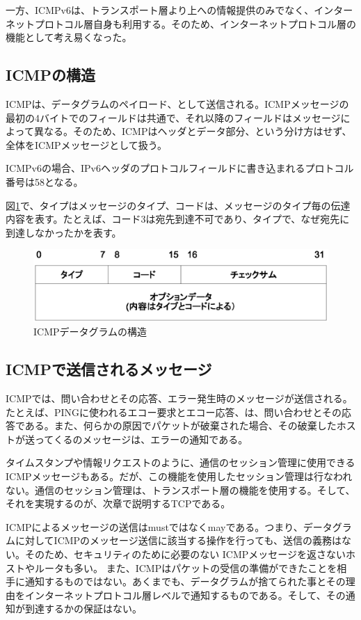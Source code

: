 一方、ICMPv6は、トランスポート層より上への情報提供のみでなく、インターネットプロトコル層自身も利用する。そのため、インターネットプロトコル層の機能として考え易くなった。

\subsection{ICMPの構造}

ICMPは、データグラムのペイロード、として送信される。ICMPメッセージの最初の4バイトでのフィールドは共通で、それ以降のフィールドはメッセージによって異なる。そのため、ICMPはヘッダとデータ部分、という分け方はせず、全体をICMPメッセージとして扱う。

ICMPv6の場合、IPv6ヘッダのプロトコルフィールドに書き込まれるプロトコル番号は58となる。

図\ref{fig:icmpheader}で、タイプはメッセージのタイプ、コードは、メッセージのタイプ毎の伝達内容を表す。たとえば、コード3は宛先到達不可であり、タイプで、なぜ宛先に到達しなかったかを表す。

\begin{figure}[htbp]
	\includegraphics[width=12cm,clip]{draw/icmpheader.eps}
	\caption{ICMPデータグラムの構造}
	\label{fig:icmpheader}
\end{figure}


\subsection{ICMPで送信されるメッセージ}

ICMPでは、問い合わせとその応答、エラー発生時のメッセージが送信される。たとえば、PINGに使われるエコー要求とエコー応答、は、問い合わせとその応答である。また、何らかの原因でパケットが破棄された場合、その破棄したホストが送ってくるのメッセージは、エラーの通知である。

タイムスタンプや情報リクエストのように、通信のセッション管理に使用できるICMPメッセージもある。だが、この機能を使用したセッション管理は行なわれない。通信のセッション管理は、トランスポート層の機能を使用する。そして、それを実現するのが、次章で説明するTCPである。

ICMPによるメッセージの送信はmustではなくmayである。つまり、データグラムに対してICMPのメッセージ送信に該当する操作を行っても、送信の義務はない。そのため、セキュリティのために必要のない ICMPメッセージを返さないホストやルータも多い。
また、ICMPはパケットの受信の準備ができたことを相手に通知するものではない。あくまでも、データグラムが捨てられた事とその理由をインターネットプロトコル層レベルで通知するものである。そして、その通知が到達するかの保証はない。


